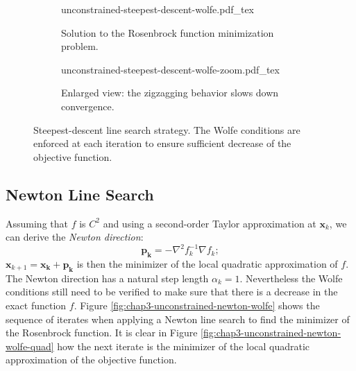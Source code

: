 \begin{figure}
  \setlength{\belowcaptionskip}{\baselineskip}
  \centering
  \begin{subfigure}{0.8\columnwidth}
    \centering
        {\def\svgwidth{\linewidth}
          {\footnotesize
            
                       {unconstrained-steepest-descent-wolfe.pdf_tex}
          }
        }
        \caption{Solution to the Rosenbrock function minimization
          problem.}
        \label{fig:chap3-unconstrained-steepest-descent-wolfe-a}
  \end{subfigure}
  \begin{subfigure}{0.8\columnwidth}
    \centering
        {\def\svgwidth{\linewidth}
          {\footnotesize
            
                       {unconstrained-steepest-descent-wolfe-zoom.pdf_tex}
          }
        }
        \caption{Enlarged view: the zigzagging behavior slows down
          convergence.}
        \label{fig:chap3-unconstrained-steepest-descent-wolfe-b}
  \end{subfigure}
  \caption[Steepest-descent line search strategy with Wolfe
    conditions.]{Steepest-descent line search strategy. The Wolfe
    conditions are enforced at each iteration to ensure sufficient
    decrease of the objective function.}
  \label{fig:chap3-unconstrained-steepest-descent-wolfe}
\end{figure}

\subsection{Newton Line Search}

Assuming that $f$ is $C^2$ and using a second-order Taylor
approximation at $\mathbf{x}_k$, we can derive the \emph{Newton
  direction}:
\begin{equation}
\mathbf{p_k} = -\nabla^2 f_k^{-1} \nabla f_k;
\end{equation}
$\mathbf{x}_{k+1}=\mathbf{x_k}+\mathbf{p_k}$ is then the minimizer of
the local quadratic approximation of $f$. The Newton direction has a
natural step length $\alpha_k=1$. Nevertheless the Wolfe conditions
still need to be verified to make sure that there is a decrease in the
exact function $f$. Figure \ref{fig:chap3-unconstrained-newton-wolfe}
shows the sequence of iterates when applying a Newton line search to
find the minimizer of the Rosenbrock function. It is clear in Figure
\ref{fig:chap3-unconstrained-newton-wolfe-quad} how the next iterate
is the minimizer of the local quadratic approximation of the objective
function.

